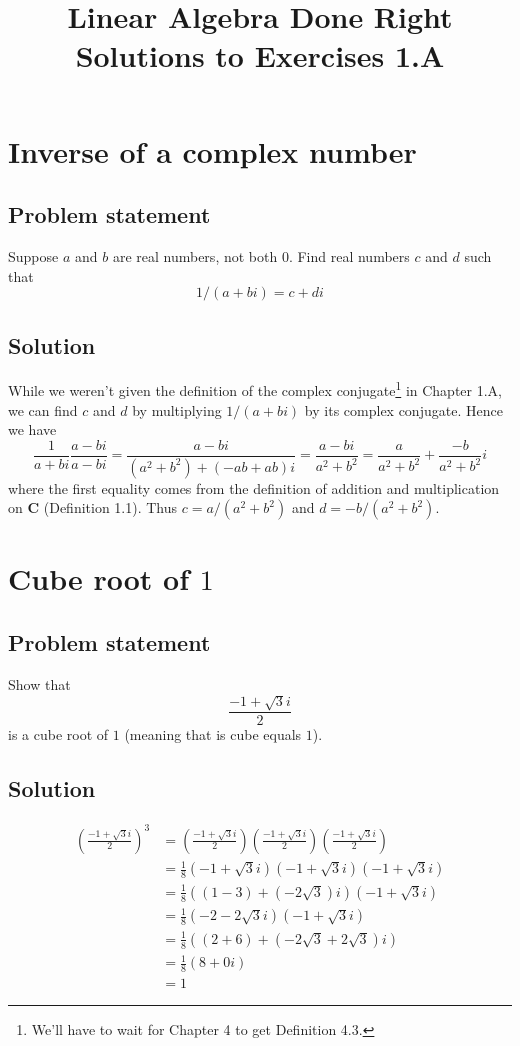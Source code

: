 \documentclass{article}
\title{Linear Algebra Done Right\\Solutions to Exercises 1.A}
\author{}
\date{}
\begin{document}
\maketitle

\section{Inverse of a complex number}
\subsection*{Problem statement}
Suppose $a$ and $b$ are real numbers, not both $0$. Find real numbers $c$ and $d$ such that 
\[1/(a+bi)=c+di\]

\subsection*{Solution}
While we weren't given the definition of the complex conjugate\footnote{We'll have to wait for Chapter 4 to get Definition 4.3.} in Chapter 1.A, we can find $c$ and $d$ by multiplying $1/(a+bi)$ by its complex conjugate. 
Hence we have
\begin{equation*}
    \frac{1}{a+bi}\frac{a-bi}{a-bi}=\frac{a-bi}{(a^2+b^2)+(-ab+ab)i}=\frac{a-bi}{a^2+b^2}=\frac{a}{a^2+b^2}+\frac{-b}{a^2+b^2}i
\end{equation*}
where the first equality comes from the definition of addition and multiplication on $\textbf{C}$ (Definition 1.1). Thus $c=a/(a^2+b^2)$ and $d=-b/(a^2+b^2)$.

\clearpage

\section{Cube root of $1$}
\subsection*{Problem statement}
Show that 
\[\frac{-1+\sqrt{3}i}{2}\]
is a cube root of $1$ (meaning that is cube equals $1$).

\subsection*{Solution}
\begin{align*}
    \left( \frac{-1+\sqrt{3}i}{2}\right)^3&=\left( \frac{-1+\sqrt{3}i}{2}\right)\left( \frac{-1+\sqrt{3}i}{2}\right) \left( \frac{-1+\sqrt{3}i}{2} \right)\\
    &=\frac{1}{8}(-1+\sqrt{3}i)(-1+\sqrt{3}i)(-1+\sqrt{3}i)\\
    &=\frac{1}{8}((1-3)+(-2\sqrt{3})i)(-1+\sqrt{3}i)\\
    &=\frac{1}{8}(-2-2\sqrt{3}i)(-1+\sqrt{3}i)\\
    &=\frac{1}{8}((2+6)+(-2\sqrt{3}+2\sqrt{3})i)\\
    &=\frac{1}{8}(8+0i)\\
    &=1
\end{align*}
\end{document}
